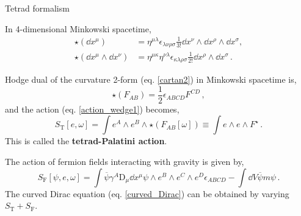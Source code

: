 \documentclass[12pt,titlepage]{article}
\begin{document}
\begin{frame}{Tetrad formalism}
    \begin{list}{\,}{\leftmargin=1em \itemindent=0em}
        \item<1-> In 4-dimensional Minkowski spacetime,
        \begin{align}
            \star(\dd{x^\mu})&=\eta^{\mu\lambda}\epsilon_{\lambda\nu\rho\sigma}\frac{1}{3!}\dd{x^\nu}\wedge\dd{x^\rho}\wedge\dd{x^\sigma},\\
            \star(\dd{x^\mu}\wedge\dd{x^\nu})&=\eta^{\mu\kappa}\eta^{\nu\lambda} \epsilon_{\kappa\lambda\rho\sigma}\frac{1}{2!}\dd{x^\rho}\wedge\dd{x^\sigma}\,.
        \end{align}
        \item<2-> Hodge dual of the curvature 2-form (eq. \ref{cartan2}) in Minkowski spacetime is,
        \begin{equation}
            \star(F_{AB})=\frac{1}{2}\epsilon_{ABCD}F^{CD}\,,
        \end{equation}
        and the action (eq. \ref{action_wedge1}) becomes,
        \begin{equation}
            S_\text{T}[e,\omega]=\int e^A\wedge e^B\wedge\star(F_{AB}[\omega])\equiv\int e\wedge e\wedge F^\star\,. 
        \end{equation}
        This is called the \textbf{tetrad-Palatini action}.
        \item<3-> The action of fermion fields interacting with gravity is given by,
        \begin{equation}
            S_\text{F}[\psi,e,\omega]=\int\overline{\psi}\gamma^A\text{D}_\mu\dd{x^\mu}\psi\wedge e^B\wedge e^C\wedge e^D\epsilon_{ABCD}-\int\dd{V}\overline{\psi}m\psi\,.
        \end{equation}
        The curved Dirac equation (eq. \ref{curved_Dirac}) can be obtained by varying $S_\text{T}+S_\text{F}$.
    \end{list}
\end{frame}
\end{document}
